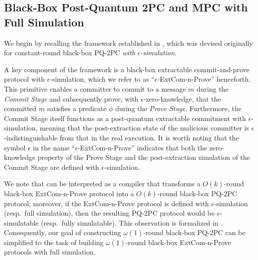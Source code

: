 

\subsection{Black-Box Post-Quantum 2PC and MPC with Full Simulation}
\label{sec:overview:full-MPC}

We begin by recalling the framework established in \cite{C:CCLY22}, which was devised originally for constant-round black-box PQ-2PC {\em with $\epsilon$-simulation}.

A key component of the \cite{C:CCLY22} framework is a black-box extractable commit-and-prove protocol with $\epsilon$-simulation, which we refer to as ``$\epsilon$-ExtCom-n-Prove'' henceforth. This primitive enables a committer to commit to a message $m$ during the {\em Commit Stage} and subsequently prove, with $\epsilon$-zero-knowledge, that the committed $m$ satisfies a predicate $\phi$ during the {\em Prove Stage}. Furthermore, the Commit Stage itself functions as a post-quantum extractable commitment with $\epsilon$-simulation, meaning that the post-extraction state of the malicious committer is $\epsilon$-indistinguishable from that in the real execution. It is worth noting that the symbol $\epsilon$ in the name ``$\epsilon$-ExtCom-n-Prove'' indicates that both the zero-knowledge property of the Prove Stage and the post-extraction simulation of the Commit Stage are defined with $\epsilon$-simulation.


We note that \cite{C:CCLY22} can be interpreted as a compiler that transforms a $O(k)$-round black-box ExtCom-n-Prove protocol into a $O(k)$-round black-box PQ-2PC protocol; moreover, if the ExtCom-n-Prove protocol is defined with $\epsilon$-simulation (resp.\  full simulation), then the resulting PQ-2PC protocol would be $\epsilon$-simulatable (resp.\ fully simulatable). This observation is formalized in . Consequently, our goal of constructing $\omega(1)$-round black-box PQ-2PC can be simplified to the task of building $\omega(1)$-round black-box ExtCom-n-Prove protocols with full simulation.


